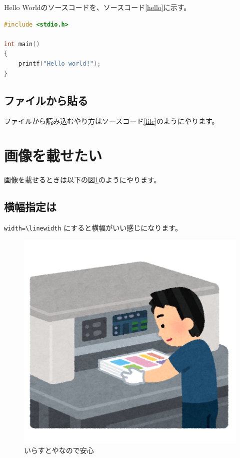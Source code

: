 \documentclass[twocolumn]{jlreq}
\begin{document}
Hello Worldのソースコードを、ソースコード\ref{hello}に示す。

\begin{lstlisting}[language=c,caption=Hello World,label=hello]
#include <stdio.h>

int main()
{
    printf("Hello world!");
}
\end{lstlisting}

\subsection{ファイルから貼る}
ファイルから読み込むやり方はソースコード\ref{file}のようにやります。



\section{画像を載せたい}

画像を載せるときは以下の図\ref{illustya}のようにやります。

\subsection{横幅指定は}

\lstinline{width=\linewidth} にすると横幅がいい感じになります。

\begin{figure}
    \includegraphics[width=\linewidth]{./img/print_seihon_operator_saidan.png}
    \caption{いらすとやなので安心}
    \label{illustya}
\end{figure}
\end{document}
